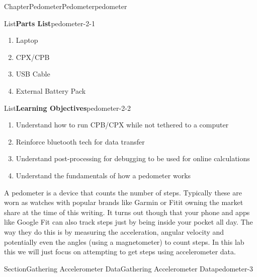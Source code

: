 \documentclass[oneside,10pt,]{book}
\numberwithin{equation}{section}
\begin{document}
%
%
\typeout{************************************************}
\typeout{************************************************}
%
\begin{chapterptx}{Chapter}{Pedometer}{}{Pedometer}{}{}{pedometer}
\renewcommand*{\chaptername}{Chapter}
\begin{introduction}{}%
\begin{listptx}{List}{\textbf{Parts List}}{pedometer-2-1}{}%
%
\begin{enumerate}
\item{}Laptop%
\item{}CPX\slash{}CPB%
\item{}USB Cable%
\item{}External Battery Pack%
\end{enumerate}
\end{listptx}%
\begin{listptx}{List}{\textbf{Learning Objectives}}{pedometer-2-2}{}%
%
\begin{enumerate}
\item{}Understand how to run CPB\slash{}CPX while not tethered to a computer%
\item{}Reinforce bluetooth tech for data transfer%
\item{}Understand post-processing for debugging to be used for online calculations%
\item{}Understand the fundamentals of how a pedometer works%
\end{enumerate}
\end{listptx}%
A pedometer is a device that counts the number of steps. Typically these are worn as watches with popular brands like Garmin or Fitit owning the market share at the time of this writing. It turns out though that your phone and apps like Google Fit can also track steps just by being inside your pocket all day. The way they do this is by measuring the acceleration, angular velocity and potentially even the angles (using a magnetometer) to count steps. In this lab this we will just focus on attempting to get steps using accelerometer data.%
\end{introduction}%
%
%
\typeout{************************************************}
\typeout{************************************************}
%
\begin{sectionptx}{Section}{Gathering Accelerometer Data}{}{Gathering Accelerometer Data}{}{}{pedometer-3}

\end{sectionptx}
\end{chapterptx}
\end{document}
